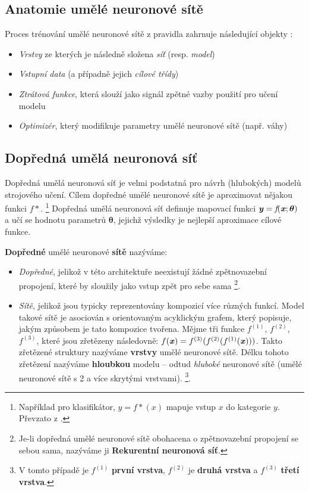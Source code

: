 \subsection{Anatomie umělé neuronové sítě}
Proces trénování umělé neuronové sítě z pravidla zahrnuje následující objekty \cite{Chollet2017}:
\begin{itemize}
    \item \emph{Vrstvy} ze kterých je následně složena \emph{síť} (resp. \emph{model})
    \item \emph{Vstupní data} (a případně jejich \emph{cílové třídy})
    \item \emph{Ztrátová funkce}, která slouží jako signál zpětné vazby použití pro učení modelu
    \item \emph{Optimizér}, který modifikuje parametry umělé neuronové sítě (např. váhy)
\end{itemize}

\subsection{Dopředná umělá neuronová síť}
\label{sec:feedforward_nn}
Dopředná umělá neuronová síť je velmi podstatná pro návrh (hlubokých) modelů strojového učení.
Cílem dopředné umělé neuronové sítě je aproximovat nějakou funkci $f*$.
\footnote{Například pro klasifikátor, $y=f*(x)$ mapuje vstup $x$ do kategorie $y$. Převzato z \cite{Goodfellow2016}.}
Dopředná umělá neuronová síť definuje mapovací funkci $\textbf{\emph{y}} = \emph{f}(\textbf{\emph{x}};\boldsymbol{\theta})$ a učí se hodnotu parametrů $\boldsymbol{\theta}$, jejichž výsledky je nejlepší aproximace cílové funkce. \cite{Goodfellow2016}

\textbf{Dopředné} umělé neuronové \textbf{sítě} nazýváme:
\begin{itemize}
    \item \emph{Dopředné}, jelikož v této architektuře neexistují žádné zpětnovazební propojení, které by sloužily jako vstup zpět pro sebe sama
    \footnote{Je-li dopředná umělé neuronové sítě obohacena o zpětnovazební propojení se sebou sama, nazýváme ji \textbf{Rekurentní neuronová síť}.}.
    \item \emph{Sítě}, jelikož jsou typicky reprezentovány kompozicí více různých funkcí.
    Model takové sítě je asociován s orientovaným acyklickým grafem, který popisuje, jakým způsobem je tato kompozice tvořena.
    Mějme tři funkce $f^{(1)}$, $f^{(2)}$, $f^{(3)}$, které jsou zřetězeny následovně: $f(\textbf{\emph{x}}) = f^{(3)}(f^{(2)}(f^{(1)}(\textbf{\emph{x}})))$.
    Takto zřetězené struktury nazýváme \textbf{vrstvy} umělé neuronové sítě. Délku tohoto zřetězení nazýváme \textbf{hloubkou} modelu – odtud \emph{hluboké} neuronové sítě (umělé neuronové sítě s 2 a více skrytými vrstvami). \cite{Goodfellow2016}
    \footnote{V tomto případě je $f^{(1)}$ \textbf{první vrstva}, $f^{(2)}$ je \textbf{druhá vrstva} a $f^{(3)}$ \textbf{třetí vrstva}.}.
\end{itemize}


